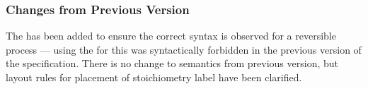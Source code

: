 \subsubsection{Changes from Previous Version}

The  has been added to ensure the correct syntax
is observed for a reversible process --- using the  for this was syntactically forbidden in the previous version of
the specification. There is no change to semantics from previous
version, but layout rules for placement of stoichiometry label have
been clarified.










